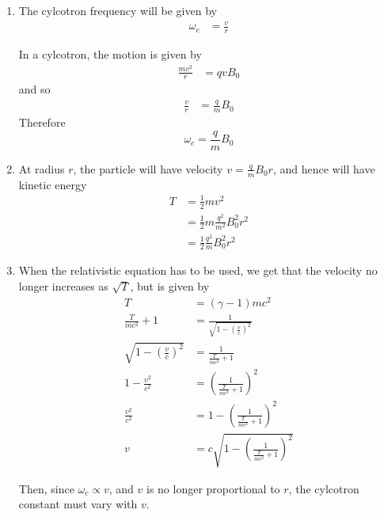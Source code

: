 \begin{enumerate}
\item 
The cylcotron frequency will be given by
\begin{align*}
	\omega_c &= \frac{v}{r}
\end{align*}

In a cylcotron, the motion is given by
\begin{align*}
	\frac{mv^2}{r} &= qvB_0
\end{align*}
and so
\begin{align*}
	\frac{v}{r} &= \frac{q}{m}B_0
\end{align*}
Therefore
\begin{displaymath}
	\omega_c = \frac{q}{m}B_0
\end{displaymath}

\item At radius $r$, the particle will have velocity $v = \frac{q}{m}B_0 r$, and hence will have kinetic energy
\begin{align*}
	T &= \frac{1}{2}mv^2 \\
		&= \frac{1}{2}m \frac{q^2}{m^2}B_0^2r^2\\
		&= \frac{1}{2}\frac{q^2}{m}B_0^2r^2
\end{align*}

\item When the relativistic equation has to be used, we get that the velocity no longer increases as $\sqrt{T}$, but is given by
\begin{align*}
	T &= (\gamma - 1)mc^2\\
	\frac{T}{mc^2}+1 &= \frac{1}{\sqrt{1 - \left(\frac{v}{c}\right)^2}}\\
	\sqrt{1 - \left( \frac{v}{c}\right)^2} &= \frac{1}{\frac{T}{mc^2}+1}\\
	1 - \frac{v^2}{c^2} &= \left(\frac{1}{\frac{T}{mc^2}+1}\right)^2\\
	\frac{v^2}{c^2} &= 1 - \left(\frac{1}{\frac{T}{mc^2}+1}\right)^2\\
	v &= c\sqrt{1 - \left(\frac{1}{\frac{T}{mc^2}+1}\right)^2}
\end{align*}

Then, since $\omega_c \propto v$, and $v$ is no longer proportional to $r$, the cylcotron constant must vary with $v$.
\end{enumerate}